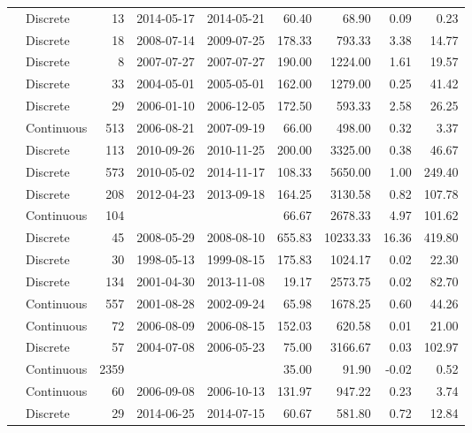 \begin{table}[ht]
\begin{tabular}{llrllrrrr}
  \citet{Gonnelli2016} & Discrete &  13 & 2014-05-17 & 2014-05-21 & 60.40 & 68.90 & 0.09 & 0.23 \\ 
  \citet{Griffin2011} & Discrete &  18 & 2008-07-14 & 2009-07-25 & 178.33 & 793.33 & 3.38 & 14.77 \\ 
  \citet{Gueguen2011} & Discrete &   8 & 2007-07-27 & 2007-07-27 & 190.00 & 1224.00 & 1.61 & 19.57 \\ 
  \citet{Helms2008} & Discrete &  33 & 2004-05-01 & 2005-05-01 & 162.00 & 1279.00 & 0.25 & 41.42 \\ 
  \citet{Hernes2008} & Discrete &  29 & 2006-01-10 & 2006-12-05 & 172.50 & 593.33 & 2.58 & 26.25 \\ 
  \citet{kattegat} & Continuous & 513 & 2006-08-21 & 2007-09-19 & 66.00 & 498.00 & 0.32 & 3.37 \\ 
  \citet{Kellerman2015} & Discrete & 113 & 2010-09-26 & 2010-11-25 & 200.00 & 3325.00 & 0.38 & 46.67 \\ 
  \citet{Lambert2015a} & Discrete & 573 & 2010-05-02 & 2014-11-17 & 108.33 & 5650.00 & 1.00 & 249.40 \\ 
  \citet{Loken2016} & Discrete & 208 & 2012-04-23 & 2013-09-18 & 164.25 & 3130.58 & 0.82 & 107.78 \\ 
  \citet{lter2004} & Continuous & 104 &  &  & 66.67 & 2678.33 & 4.97 & 101.62 \\ 
  \citet{lter2008} & Discrete &  45 & 2008-05-29 & 2008-08-10 & 655.83 & 10233.33 & 16.36 & 419.80 \\ 
  \citet{lter5653} & Discrete &  30 & 1998-05-13 & 1999-08-15 & 175.83 & 1024.17 & 0.02 & 22.30 \\ 
  \citet{lter5689} & Discrete & 134 & 2001-04-30 & 2013-11-08 & 19.17 & 2573.75 & 0.02 & 82.70 \\ 
  \citet{Markager2011} & Continuous & 557 & 2001-08-28 & 2002-09-24 & 65.98 & 1678.25 & 0.60 & 44.26 \\ 
  \citet{Massicotte2011EA} & Continuous &  72 & 2006-08-09 & 2006-08-15 & 152.03 & 620.58 & 0.01 & 21.00 \\ 
  \citet{Moran2006} & Discrete &  57 & 2004-07-08 & 2006-05-23 & 75.00 & 3166.67 & 0.03 & 102.97 \\ 
  \citet{Nelson2002, Nelson2007, Nelson2010} & Continuous & 2359 &  &  & 35.00 & 91.90 & -0.02 & 0.52 \\ 
  \citet{Norman2011} & Continuous &  60 & 2006-09-08 & 2006-10-13 & 131.97 & 947.22 & 0.23 & 3.74 \\ 
  \citet{Oestreich2016} & Discrete &  29 & 2014-06-25 & 2014-07-15 & 60.67 & 581.80 & 0.72 & 12.84 \\ 

\end{tabular}
\end{table}
